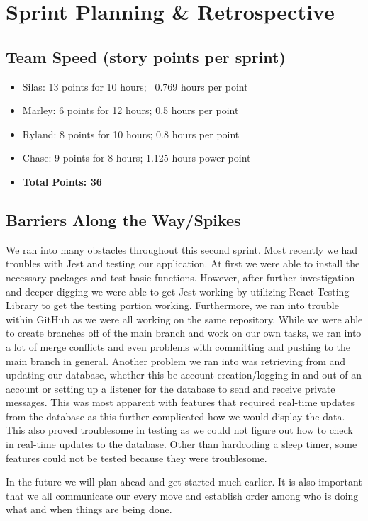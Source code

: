 \section{Sprint Planning \& Retrospective}
\subsection{Team Speed (story points per sprint)}
\begin{itemize}
    \item Silas: 13 points for 10 hours; ~0.769 hours per point
    \item Marley: 6 points for 12 hours; 0.5 hours per point
    \item Ryland: 8 points for 10 hours; 0.8 hours per point
    \item Chase: 9 points for 8 hours; 1.125 hours power point
    \item \textbf{Total Points: 36}
\end{itemize}

\subsection{Barriers Along the Way/Spikes}
We ran into many obstacles throughout this second sprint. Most recently we had troubles with Jest and testing our application. At first we were able to install the necessary packages and test basic functions. However, after further investigation and deeper digging we were able to get Jest working by utilizing React Testing Library to get the testing portion working. Furthermore, we ran into trouble within GitHub as we were all working on the same repository. While we were able to create branches off of the main branch and work on our own tasks, we ran into a lot of merge conflicts and even problems with committing and pushing to the main branch in general. Another problem we ran into was retrieving from and updating our database, whether this be account creation/logging in and out of an account or setting up a listener for the database to send and receive private messages. This was most apparent with features that required real-time updates from the database as this further complicated how we would display the data. This also proved troublesome in testing as we could not figure out how to check in real-time updates to the database. Other than hardcoding a sleep timer, some features could not be tested because they were troublesome.

In the future we will plan ahead and get started much earlier. It is also important that we all communicate our every move and establish order among who is doing what and when things are being done.
